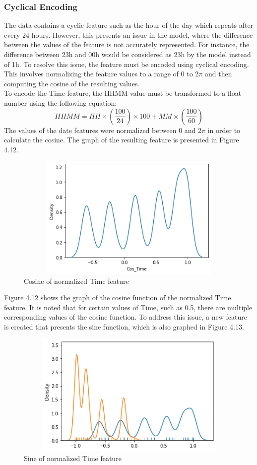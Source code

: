 \documentclass{report}
\begin{document}
\subsubsection{Cyclical Encoding}
The data contains a cyclic feature such as the hour of the day which repeats after every 24 hours. However, this presents an issue in the model, where the difference between the values of the feature is not accurately represented. For instance, the difference between 23h and 00h would be considered as 23h by the model instead of 1h. To resolve this issue, the feature must be encoded using cyclical encoding. This involves normalizing the feature values to a range of 0 to 2{$\pi$} and then computing the cosine of the resulting values. \hfill \break 
\\
To encode the Time feature, the HHMM value must be transformed to a float number using the following equation:
\begin{equation}
    HHMM = HH\times(\frac{100}{24})\times100 + MM\times(\frac{100}{60})
\end{equation}
The values of the date features were normalized between 0 and 2$\pi$ in order to calculate the cosine. The graph of the resulting feature is presented in Figure 4.12.
\begin{figure}[h!]
  \centering
    \includegraphics[width=12cm, height=6cm] {aaa.png}
    \caption{Cosine of normalized Time feature}
    \label{fig:my_label}
\end{figure}
\hfill \break 
Figure 4.12 shows the graph of the cosine function of the normalized Time feature. It is noted that for certain values of Time, such as 0.5, there are multiple corresponding values of the cosine function. To address this issue, a new feature is created that presents the sine function, which is also graphed in Figure 4.13.\hfill \break 
\begin{figure}[h!]
  \centering
    \includegraphics[width=12cm, height=6cm] {bbb.png}
    \caption{Sine of normalized Time feature}
    \label{fig:my_label}
\end{figure} \newpage
\end{document}
